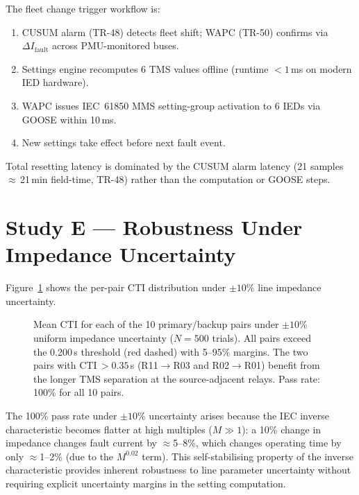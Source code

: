 \documentclass[11pt,a4paper]{article}
\begin{document}
\noindent
The fleet change trigger workflow is:
\begin{enumerate}
  \item CUSUM alarm (TR-48) detects fleet shift; WAPC (TR-50) confirms via
    $\Delta I_\mathrm{fault}$ across PMU-monitored buses.
  \item Settings engine recomputes 6 TMS values offline (runtime $<1$\,ms
    on modern IED hardware).
  \item WAPC issues IEC~61850 MMS setting-group activation to 6 IEDs
    via GOOSE within 10\,ms.
  \item New settings take effect before next fault event.
\end{enumerate}

Total resetting latency is dominated by the CUSUM alarm latency (21
samples\,$\approx$\,21\,min field-time, TR-48) rather than the computation
or GOOSE steps.

\section{Study E --- Robustness Under Impedance Uncertainty}
\label{sec:studyE}

Figure~\ref{fig:robustness} shows the per-pair CTI distribution under
$\pm10\%$ line impedance uncertainty.

\begin{figure}[htbp]
  \centering
  \resizebox{0.96\textwidth}{!}{}
  \caption{Mean CTI for each of the 10 primary/backup pairs under
           $\pm10\%$ uniform impedance uncertainty ($N=500$ trials).
           All pairs exceed the 0.200\,s threshold (red dashed) with
           5--95\% margins.  The two pairs with CTI\,$>0.35$\,s
           (R11$\to$R03 and R02$\to$R01) benefit from the longer
           TMS separation at the source-adjacent relays.
           Pass rate: 100\% for all 10 pairs.}
  \label{fig:robustness}
\end{figure}

\noindent
The 100\% pass rate under $\pm10\%$ uncertainty arises because the IEC
inverse characteristic becomes flatter at high multiples ($M\gg1$):
a 10\% change in impedance changes fault current by $\approx$5--8\%,
which changes operating time by only $\approx$1--2\% (due to the
$M^{0.02}$ term).  This self-stabilising property of the inverse
characteristic provides inherent robustness to line parameter
uncertainty without requiring explicit uncertainty margins in the
setting computation.
\end{document}
